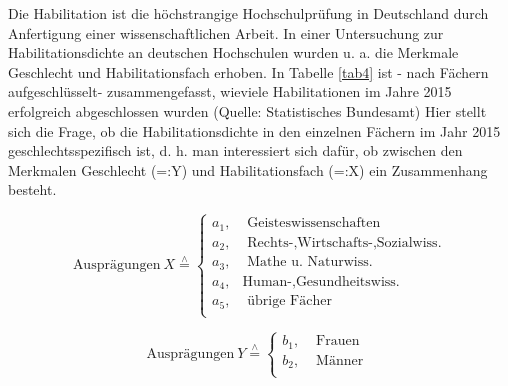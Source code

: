 \documentclass[11pt]{article}
\begin{document}
\begin{enumerate}
Die Habilitation ist die höchstrangige Hochschulprüfung in Deutschland durch Anfertigung einer wissenschaftlichen Arbeit.
In einer Untersuchung zur Habilitationsdichte an deutschen Hochschulen wurden u. a. die Merkmale Geschlecht und Habilitationsfach erhoben. In Tabelle 
\ref{tab4} ist - nach Fächern aufgeschlüsselt- zusammengefasst, wieviele Habilitationen im Jahre 2015 erfolgreich abgeschlossen wurden 
(Quelle: Statistisches Bundesamt) Hier stellt sich die Frage, ob die Habilitationsdichte in den einzelnen Fächern im Jahr 2015
geschlechtsspezifisch ist, d. h. man interessiert sich dafür, ob zwischen den Merkmalen Geschlecht (=:Y) und Habilitationsfach (=:X) ein Zusammenhang besteht.


   \[
   \text{Ausprägungen} \: X  \overset{\wedge}{=} \left\{\begin{array}{ll} %
         a_1, &  \text{ Geisteswissenschaften} \\
         a_2, &  \text{ Rechts-,Wirtschafts-,Sozialwiss.} \\
         a_3, &  \text{ Mathe u. Naturwiss.} \\
         a_4, &  \text{Human-,Gesundheitswiss.} \\
         a_5, &  \text{ übrige Fächer} \\
        \end{array}\right.
  \]
  
     \[
    \text{Ausprägungen} \:  Y  \overset{\wedge}{=} \left\{\begin{array}{ll}  
         b_1, &  \text{  Frauen} \\
         b_2, &  \text{ Männer } \\
        \end{array}\right.
  \]


\end{enumerate}
\end{document}

